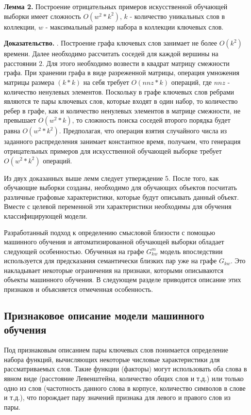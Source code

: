 \textbf{Лемма 2.} Построение отрицательных примеров искусственной обучающей выборки имеет сложность $O(w^2 * k^2)$, $k$ - количество уникальных слов в коллекции, $w$ - максимальный размер набора в коллекции ключевых слов.

\textbf{Доказательство.} 
. Построение графа ключевых слов занимает не более $O(k^2)$ времени. Далее необходимо рассчитать соседей для каждой вершины на расстоянии $2$. Для этого необходимо возвести в квадрат матрицу смежности графа. При хранении графа в виде разреженной матрицы, операция умножения матрицы размера $(k*k)$ на себя требует $O(nnz * k)$ операций, где $nnz$ - количество ненулевых элементов. Поскольку в графе ключевых слов ребрами являются те пары ключевых слов, которые входят в один набор, то количество ребер в графе, как и количество ненулевых элементов в матрице смежности, не превышает $O(w^2 * k)$, то сложность поиска соседей второго порядка будет равна $O(w^2 * k^2)$. Предполагая, что операция взятия случайного числа из заданного распределения занимает константное время, получаем, что генерация отрицательных примеров для искусственной обучающей выборке требует $O(w^2 * k^2)$ операций.

Из двух доказанных выше лемм следует утверждение 5. После того, как обучающие выборки созданы, необходимо для обучающих объектов посчитать различные графовые характеристики, которые будут описывать данный объект. Вместе с целевой переменной эти характеристики необходимы для обучения классифицирующей модели.

Разработанный подход к определению смысловой близости с помощью машинного обучения и автоматизированной обучающей выборки обладает следующей особенностью. Обученная на графе $G^m_{kw}$ модель впоследствии используется для предсказания семантически близких пар уже на графе $G_{kw}$. Это накладывает некоторые ограничения на признаки, которыми описываются объекты машинного обучения. В следующем разделе приводится описание этих признаков и объясняется отмеченная особенность.

\subsection{Признаковое описание модели машинного обучения} \label{sec:features}
Под признаковым описанием пары ключевых слов понимается определение набора функций, вычисляющих некоторые числовые характеристики для рассматриваемых слов. Такие функции (факторы) могут использовать оба слова в явном виде (расстояние Левенштейна, количество общих слов и т.д.) или только одно из слов (частотность данного слова в корпусе, количество символов в слове и т.д.), что порождает пару значений признака для левого и правого слов из пары. 

